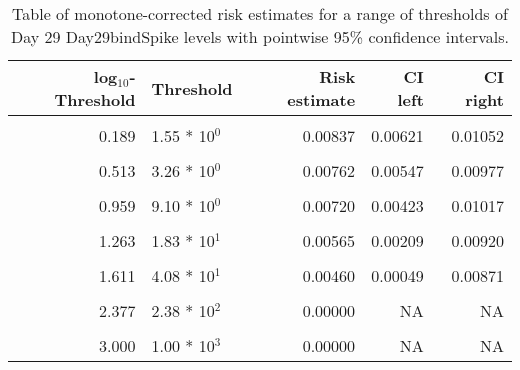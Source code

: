 \documentclass[]{article}
\begin{document}
\begin{table}[!h]

\caption{\label{tab:unnamed-chunk-35}Table of monotone-corrected risk estimates for a range of thresholds of Day 29 Day29bindSpike levels with pointwise 95\% confidence intervals.}
\centering
\begin{tabular}[t]{rlrrr}
\toprule
log$_{10}$-Threshold & Threshold & Risk estimate & CI left & CI right\\
\midrule
\cellcolor{gray!6}{-0.813} & \cellcolor{gray!6}{1.54 * 10$^{1}$} & \cellcolor{gray!6}{0.00878} & \cellcolor{gray!6}{0.00676} & \cellcolor{gray!6}{0.01080}\\
0.189 & 1.55 * 10$^{0}$ & 0.00837 & 0.00621 & 0.01052\\
\cellcolor{gray!6}{0.341} & \cellcolor{gray!6}{2.19 * 10$^{0}$} & \cellcolor{gray!6}{0.00820} & \cellcolor{gray!6}{0.00605} & \cellcolor{gray!6}{0.01034}\\
0.513 & 3.26 * 10$^{0}$ & 0.00762 & 0.00547 & 0.00977\\
\cellcolor{gray!6}{0.792} & \cellcolor{gray!6}{6.19 * 10$^{0}$} & \cellcolor{gray!6}{0.00749} & \cellcolor{gray!6}{0.00506} & \cellcolor{gray!6}{0.00993}\\
0.959 & 9.10 * 10$^{0}$ & 0.00720 & 0.00423 & 0.01017\\
\cellcolor{gray!6}{1.113} & \cellcolor{gray!6}{1.30 * 10$^{1}$} & \cellcolor{gray!6}{0.00639} & \cellcolor{gray!6}{0.00297} & \cellcolor{gray!6}{0.00981}\\
1.263 & 1.83 * 10$^{1}$ & 0.00565 & 0.00209 & 0.00920\\
\cellcolor{gray!6}{1.491} & \cellcolor{gray!6}{3.10 * 10$^{1}$} & \cellcolor{gray!6}{0.00460} & \cellcolor{gray!6}{0.00103} & \cellcolor{gray!6}{0.00818}\\
1.611 & 4.08 * 10$^{1}$ & 0.00460 & 0.00049 & 0.00871\\
\cellcolor{gray!6}{1.729} & \cellcolor{gray!6}{5.36 * 10$^{1}$} & \cellcolor{gray!6}{0.00397} & \cellcolor{gray!6}{0.00068} & \cellcolor{gray!6}{0.00726}\\
2.377 & 2.38 * 10$^{2}$ & 0.00000 & NA & NA\\
\cellcolor{gray!6}{2.699} & \cellcolor{gray!6}{5.00 * 10$^{2}$} & \cellcolor{gray!6}{0.00000} & \cellcolor{gray!6}{NA} & \cellcolor{gray!6}{NA}\\
3.000 & 1.00 * 10$^{3}$ & 0.00000 & NA & NA\\
\bottomrule
\end{tabular}
\end{table}
\end{document}
